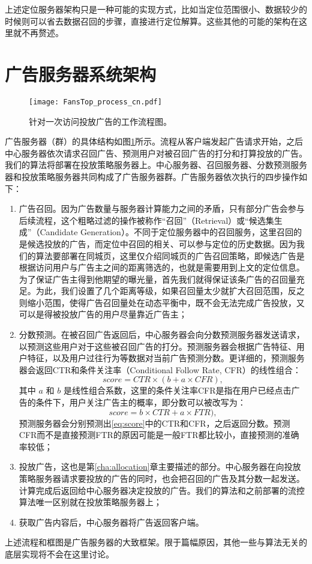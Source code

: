 上述定位服务器架构只是一种可能的实现方式，比如当定位范围很小、数据较少的时候则可以省去数据召回的步骤，直接进行定位解算。这些其他的可能的架构在这里就不再赘述。

\section{广告服务器系统架构} \label{sec:ad}

\begin{figure}[htb]
	\centering
	\texttt{[image: FansTop\_process\_cn.pdf]}
	\caption{针对一次访问投放广告的工作流程图。}
	\label{fig:fssys}
\end{figure}

广告服务器（群）的具体结构如图\ref{fig:fssys}所示。流程从客户端发起广告请求开始，之后中心服务器依次请求召回广告、预测用户对被召回广告的打分和打算投放的广告。我们的算法将部署在投放策略服务器上。中心服务器、召回服务器、分数预测服务器和投放策略服务器共同构成了广告服务器群。广告服务器依次执行的四步操作如下：
\begin{enumerate}
	\item 广告召回。因为广告数量与服务器计算能力之间的矛盾，只有部分广告会参与后续流程，这个粗略过滤的操作被称作“召回”（Retrieval）或“候选集生成”（Candidate Generation）。不同于定位服务器中的召回服务，这里召回的是候选投放的广告，而定位中召回的相关、可以参与定位的历史数据。因为我们的算法要部署在同城页，这里仅介绍同城页的广告召回策略，即候选广告是根据访问用户与广告主之间的距离筛选的，也就是需要用到上文的定位信息。为了保证广告主得到他期望的曝光量，首先我们就得保证该条广告的召回量充足。为此，我们设置了几个距离等级，如果召回量太少就扩大召回范围，反之则缩小范围，使得广告召回量处在动态平衡中，既不会无法完成广告投放，又可以是得被投放广告的用户尽量靠近广告主；
	\item 分数预测。在被召回广告返回后，中心服务器会向分数预测服务器发送请求，以预测这些用户对于这些被召回广告的打分。预测服务器会根据广告特征、用户特征，以及用户过往行为等数据对当前广告预测分数。更详细的，预测服务器会返回CTR和条件关注率（Conditional Follow Rate, CFR）的线性组合：
	\begin{equation}
		score = CTR \times  (b + a \times CFR), \label{eq:score}
	\end{equation}
	其中 $a$ 和 $b$ 是线性组合系数，这里的条件关注率CFR是指在用户已经点击广告的条件下，用户关注广告主的概率，即分数可以被改写为：
	\begin{equation}
	score = b \times CTR + a \times FTR), 
	\end{equation}
	预测服务器会分别预测出\eqref{eq:score}中的CTR和CFR，之后返回分数。预测CFR而不是直接预测FTR的原因可能是一般FTR都比较小，直接预测的准确率较低；
	\item 投放广告，这也是第\ref{cha:allocation}章主要描述的部分。中心服务器在向投放策略服务器请求要投放的广告的同时，也会把召回的广告及其分数一起发送。计算完成后返回给中心服务器决定投放的广告。我们的算法和之前部署的流控算法唯一区别就在投放策略服务器上；
	\item 获取广告内容后，中心服务器将广告返回客户端。
\end{enumerate}

上述流程和框图是广告服务器的大致框架。限于篇幅原因，其他一些与算法无关的底层实现将不会在这里讨论。





